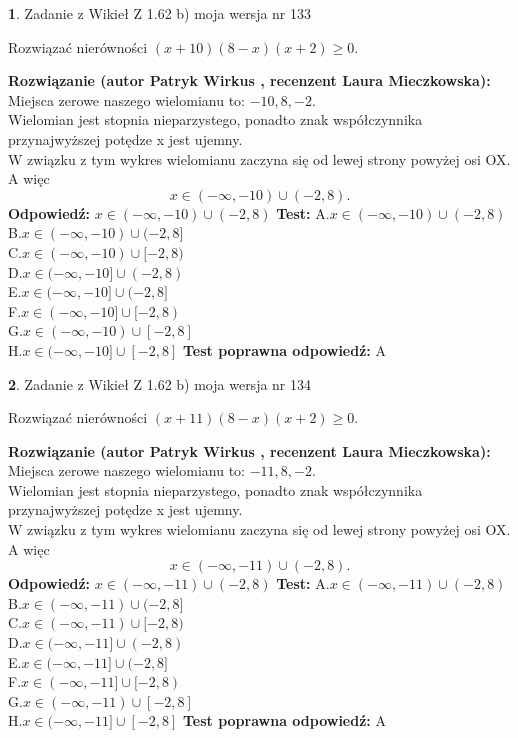 \documentclass[12pt, a4paper]{article}
\theoremstyle{definition} %
\newtheorem{zad}{}
\newcommand{\zadStart}[1]{\begin{zad}#1\newline}
\newcommand{\zadStop}{\end{zad}}
\newcommand{\rozwStart}[2]{\noindent \textbf{Rozwiązanie (autor #1 , recenzent #2): }\newline}
\newcommand{\rozwStop}{\newline}
\newcommand{\odpStart}{\noindent \textbf{Odpowiedź:}\newline}
\newcommand{\odpStop}{\newline}
\newcommand{\testStart}{\noindent \textbf{Test:}\newline}
\newcommand{\testStop}{\newline}
\newcommand{\kluczStart}{\noindent \textbf{Test poprawna odpowiedź:}\newline}
\newcommand{\kluczStop}{\newline}
\begin{document}
\zadStart{Zadanie z Wikieł Z 1.62 b) moja wersja nr 133}

Rozwiązać nierówności $(x+10)(8-x)(x+2)\ge0$.
\zadStop
\rozwStart{Patryk Wirkus}{Laura Mieczkowska}
Miejsca zerowe naszego wielomianu to: $-10, 8, -2$.\\
Wielomian jest stopnia nieparzystego, ponadto znak współczynnika przy\linebreak najwyższej potędze x jest ujemny.\\ W związku z tym wykres wielomianu zaczyna się od lewej strony powyżej osi OX. A więc $$x \in (-\infty,-10) \cup (-2,8).$$
\rozwStop
\odpStart
$x \in (-\infty,-10) \cup (-2,8)$
\odpStop
\testStart
A.$x \in (-\infty,-10) \cup (-2,8)$\\
B.$x \in (-\infty,-10) \cup (-2,8]$\\
C.$x \in (-\infty,-10) \cup [-2,8)$\\
D.$x \in (-\infty,-10] \cup (-2,8)$\\
E.$x \in (-\infty,-10] \cup (-2,8]$\\
F.$x \in (-\infty,-10] \cup [-2,8)$\\
G.$x \in (-\infty,-10) \cup [-2,8]$\\
H.$x \in (-\infty,-10] \cup [-2,8]$
\testStop
\kluczStart
A
\kluczStop



\zadStart{Zadanie z Wikieł Z 1.62 b) moja wersja nr 134}

Rozwiązać nierówności $(x+11)(8-x)(x+2)\ge0$.
\zadStop
\rozwStart{Patryk Wirkus}{Laura Mieczkowska}
Miejsca zerowe naszego wielomianu to: $-11, 8, -2$.\\
Wielomian jest stopnia nieparzystego, ponadto znak współczynnika przy\linebreak najwyższej potędze x jest ujemny.\\ W związku z tym wykres wielomianu zaczyna się od lewej strony powyżej osi OX. A więc $$x \in (-\infty,-11) \cup (-2,8).$$
\rozwStop
\odpStart
$x \in (-\infty,-11) \cup (-2,8)$
\odpStop
\testStart
A.$x \in (-\infty,-11) \cup (-2,8)$\\
B.$x \in (-\infty,-11) \cup (-2,8]$\\
C.$x \in (-\infty,-11) \cup [-2,8)$\\
D.$x \in (-\infty,-11] \cup (-2,8)$\\
E.$x \in (-\infty,-11] \cup (-2,8]$\\
F.$x \in (-\infty,-11] \cup [-2,8)$\\
G.$x \in (-\infty,-11) \cup [-2,8]$\\
H.$x \in (-\infty,-11] \cup [-2,8]$
\testStop
\kluczStart
A
\kluczStop
\end{document}
